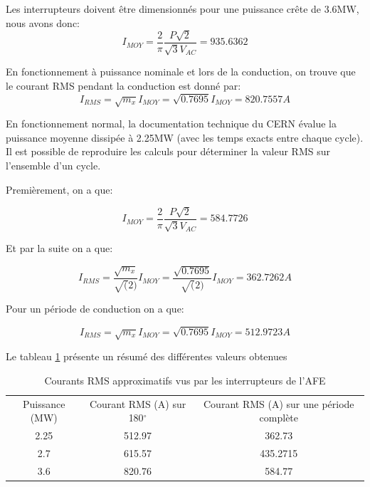 Les interrupteurs doivent être dimensionnés pour une puissance crête de 3.6MW, nous avons donc:
\begin{equation}
I_{MOY} = \frac{2}{\pi} \frac{P\sqrt{2}}{\sqrt{3}V_{AC}} = 935.6362
\end{equation}

En fonctionnement à puissance nominale et lors de la conduction, on trouve que le courant RMS pendant la conduction est donné par:
\begin{equation}
I_{RMS} =  \sqrt{m_x}I_{MOY} = \sqrt{0.7695}I_{MOY} = 820.7557A
\end{equation}

En fonctionnement normal, la documentation technique du CERN évalue la puissance moyenne dissipée à 2.25MW (avec les temps exacts entre chaque cycle). Il est possible de reproduire les calculs pour déterminer la valeur RMS sur l'ensemble d'un cycle.

Premièrement, on a que:

\begin{equation}
I_{MOY} = \frac{2}{\pi} \frac{P\sqrt{2}}{\sqrt{3}V_{AC}} = 584.7726
\end{equation}

Et par la suite on a que:

\begin{equation}
I_{RMS} =  \frac{\sqrt{m_x}}{\sqrt(2)}I_{MOY} = \frac{\sqrt{0.7695}}{\sqrt(2)}I_{MOY} = 362.7262A
\end{equation}

Pour un période de conduction on a que:

\begin{equation}
I_{RMS} =  \sqrt{m_x}I_{MOY} = \sqrt{0.7695}I_{MOY} = 512.9723A
\end{equation}

Le tableau \ref{tab_Courant_AFE} présente un résumé des différentes valeurs obtenues

\begin{table}[htb]
\begin{tabular}{|c|c|c|}
\hline
\multirow{2}{*}{Puissance (MW)} & \multirow{2}{*}{Courant RMS (A) sur 180$^\circ$} & \multirow{2}{*}{Courant RMS (A) sur une période complète} \\
                                &                                                 &                                                           \\ \hline
2.25                            & 512.97                                          & 362.73                                                    \\ \hline
2.7                             & 615.57                                          & 435.2715                                                    \\ \hline
3.6                             & 820.76                                          & 584.77                                                   \\ \hline
\end{tabular}
\caption{Courants RMS approximatifs vus par les interrupteurs de l'AFE}
\label{tab_Courant_AFE}
\end{table}

